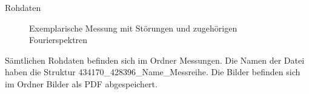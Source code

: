 \documentclass[twoside]{protokoll}
\begin{document}
\begin{aufgabe}{Rohdaten}
\begin{figure}[H]
    \caption{Exemplarische Messung mit Störungen und zugehörigen Fourierspektren}
  \centering
\end{figure}
\begin{figure}[H]
  \centering
\end{figure}

Sämtlichen Rohdaten befinden sich im Ordner Messungen. Die Namen der Datei haben die 
Struktur 434170\_428396\_Name\_Messreihe.
Die Bilder befinden sich im Ordner Bilder als PDF abgespeichert.
\end{aufgabe}
\end{document}
